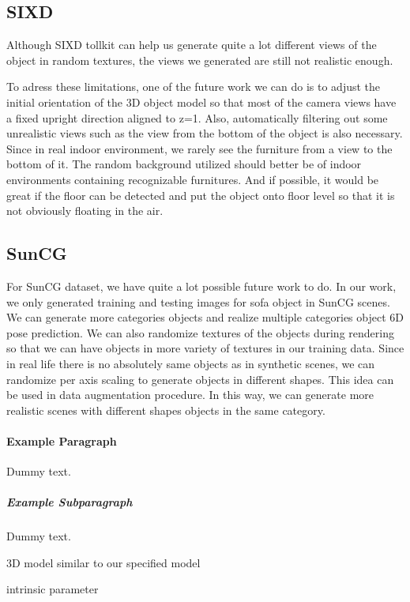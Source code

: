 \subsection{SIXD}
\label{sec:SIXD}
Although SIXD tollkit can help us generate quite a lot different views of the object in random textures, the views we generated are still not realistic enough.

To adress these limitations, one of the future work we can do is to adjust the initial orientation of the 3D object model so that most of the camera views have a fixed upright direction aligned to z=1. Also, automatically filtering out some unrealistic views such as the view from the bottom of the object is also necessary. Since in real indoor environment, we rarely see the furniture from a view to the bottom of it. The random background utilized should better be of indoor environments containing recognizable furnitures. And if possible, it would be great if the floor can be detected and put the object onto floor level so that it is not obviously floating in the air.

\subsection{SunCG}

For SunCG dataset, we have quite a lot possible future work to do. In our work, we only generated training and testing images for sofa object in SunCG scenes. We can generate more categories objects and realize multiple categories object 6D pose prediction. We can also randomize textures of the objects during rendering so that we can have objects in more variety of textures in our training data. Since in real life there is no absolutely same objects as in synthetic scenes, we can randomize per axis scaling to generate objects in different shapes. This idea can be used in data augmentation procedure. In this way, we can generate more realistic scenes with different shapes objects in the same category.


\paragraph{Example Paragraph}

Dummy text.

\subparagraph{Example Subparagraph}

Dummy text.


3D model similar to our specified model

 intrinsic parameter